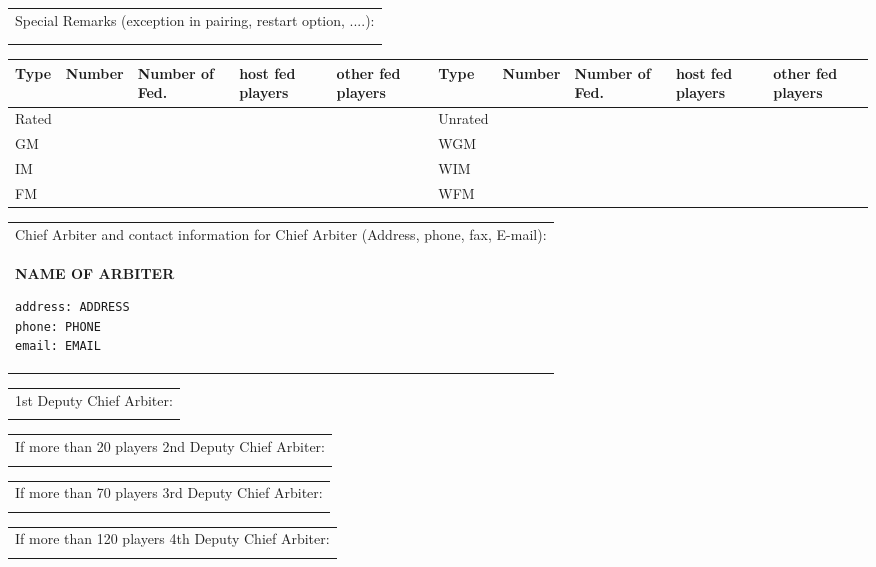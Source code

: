 \documentclass[11pt, a4paper]{article}
\begin{document}
\begin{table}[ht]
\noindent\begin{tabular}{|p{16.4cm}|}
Special Remarks (exception in pairing, restart option, ....):\\
\\
\\
\hline
\end{tabular}

\noindent\begin{tabular}{|p{1.3cm}|p{1.25cm}|p{1.25cm}|p{1.25cm}|p{1.25cm}|p{1.3cm}|p{1.25cm}|p{1.25cm}|p{1.25cm}|p{1.25cm}|}
Type&Number&Number of Fed.&host fed players&other fed players&Type&Number&Number of Fed.&host fed players&other fed players\\
\hline
Rated& & & & &Unrated& & & & \\
\hline
GM& & & & &WGM& & & & \\
\hline
IM& & & & &WIM& & & & \\
\hline
FM& & & & &WFM& & & & \\
\hline
\end{tabular}


\noindent\begin{tabular}{|p{16.4cm}|}
Chief Arbiter and contact information for Chief Arbiter (Address, phone, fax, E-mail):\\
{\normalsize\bfseries NAME OF ARBITER}
\begin{verbatim}
address: ADDRESS
phone: PHONE
email: EMAIL
\end{verbatim}
\\
\hline
\end{tabular}

\noindent\begin{tabular}{|p{16.4cm}|}
1st Deputy Chief Arbiter:\\
{\normalsize}\\
\hline
\end{tabular}

\noindent\begin{tabular}{|p{16.4cm}|}
If more than 20 players 2nd Deputy Chief Arbiter:\\
{\normalsize}\\
\hline
\end{tabular}

\noindent\begin{tabular}{|p{16.4cm}|}
If more than 70 players 3rd Deputy Chief Arbiter:\\
{\normalsize}\\
\hline
\end{tabular}

\noindent\begin{tabular}{|p{16.4cm}|}
If more than 120 players 4th Deputy Chief Arbiter:\\
{\normalsize}\\
\hline
\end{tabular}


\end{table}

\end{document}
